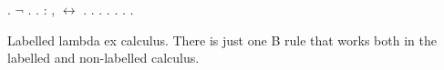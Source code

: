 \documentclass[12pt]{report}
\begin{document}
\begin{coqdoccode}
\coqdocindent{1.00em}
 . \ensuremath{\lnot} .\coqdoceol
\coqdocnoindent
{}.\coqdoceol
\coqdocemptyline
\coqdocnoindent
{}  : \coqdockw{\ensuremath{\forall}} ,   \ensuremath{\leftrightarrow}  .\coqdoceol
\coqdocnoindent
{}. . .  .  . .\coqdoceol
\coqdocemptyline
\end{coqdoccode}
Labelled lambda ex calculus. There is just one B rule that works
both in the labelled and non-labelled calculus. 
\end{document}
